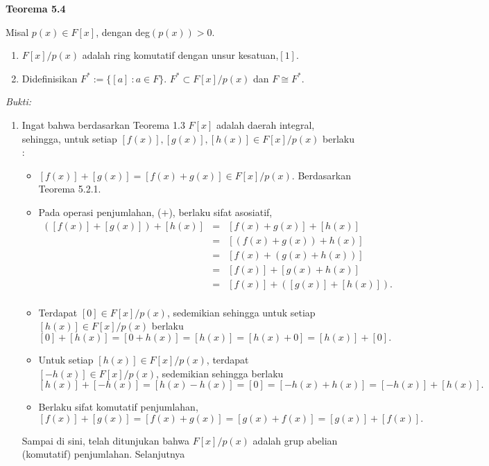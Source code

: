 	\textbf{Teorema 5.4}
\par 	Misal $p(x) \in F[x]$, dengan deg$(p(x)) >0.$
	\begin{enumerate}
	\item $F[x]/p(x)$ adalah ring komutatif dengan unsur kesatuan,$[1]$.
	\item Didefinisikan $F^* := \{ [a]~:a\in F \}$. $F^* \subset F[x]/p(x)$ dan $F\cong F^*.$\\
	\end{enumerate}
	\textit{Bukti:}
	\begin{enumerate}
	\item Ingat bahwa berdasarkan Teorema 1.3 $F[x]$ adalah daerah integral, sehingga, untuk setiap $[f(x)],[g(x)],[h(x)] \in F[x]/p(x)$  berlaku :
		\begin{itemize}
		\item $[f(x)]+[g(x)] = [f(x)+g(x)] \in F[x]/p(x)$. Berdasarkan Teorema 5.2.1. 
		\item Pada operasi penjumlahan, ($+$), berlaku sifat asosiatif,\\
		 	$\begin{array}{rcl}
			([f(x)]+[g(x)])+[h(x)] &=& [f(x)+g(x)]+[h(x)]\\
			&=& [(f(x)+g(x))+h(x)]\\
			&=& [f(x)+(g(x)+h(x))]\\
			&=& [f(x)]+[g(x)+h(x)]\\
			&=& [f(x)]+([g(x)]+[h(x)]).\\
			\end{array}$
		\item Terdapat $[0] \in F[x]/p(x)$, sedemikian sehingga untuk setiap $[h(x)] \in F[x]/p(x)$ berlaku $$[0]+[h(x)] = [0+h(x)]=[h(x)]=[h(x)+0]=[h(x)]+[0].$$
		\item Untuk setiap $[h(x)] \in F[x]/p(x)$, terdapat $[-h(x)] \in F[x]/p(x)$, sedemikian sehingga berlaku $$[h(x)]+[-h(x)] = [h(x)-h(x)]=[0]=[-h(x)+h(x)]=[-h(x)]+[h(x)].$$
		\item Berlaku sifat komutatif penjumlahan, \\$[f(x)]+[g(x)] = [f(x)+g(x)]=[g(x)+f(x)]=[g(x)]+[f(x)].$
		\end{itemize}
	Sampai di sini, telah ditunjukan bahwa $F[x]/p(x)$ adalah grup abelian (komutatif) penjumlahan. Selanjutnya
\end{enumerate}
